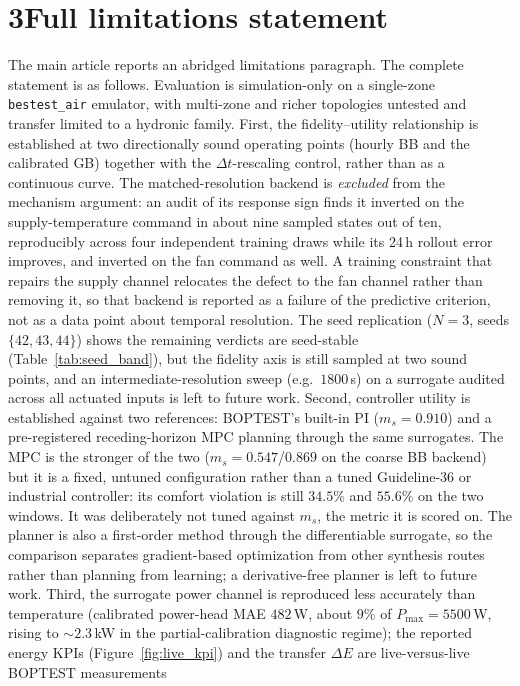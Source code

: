 \documentclass[11pt,a4paper]{article}
\begin{document}
\section*{3\quad Full limitations statement}
The main article reports an abridged limitations paragraph. The complete statement is as follows.
Evaluation is simulation-only on a single-zone \texttt{bestest\_air} emulator, with multi-zone and
richer topologies untested and transfer limited to a hydronic family. First, the fidelity--utility
relationship is established at two directionally sound operating points (hourly BB and the
calibrated GB) together with the $\Delta t$-rescaling control, rather than as a continuous curve.
The matched-resolution backend is \emph{excluded} from the mechanism argument: an audit of its
response sign finds it inverted on the supply-temperature command in about nine sampled states out
of ten, reproducibly across four independent training draws while its 24\,h rollout error improves,
and inverted on the fan command as well. A training constraint that repairs the supply channel
relocates the defect to the fan channel rather than removing it, so that backend is reported as a
failure of the predictive criterion, not as a data point about temporal resolution. The seed
replication ($N=3$, seeds $\{42,43,44\}$) shows the remaining verdicts are seed-stable
(Table~\ref{tab:seed_band}), but the fidelity axis is still sampled at two sound points, and an
intermediate-resolution sweep (e.g.\ $1800$\,s) on a surrogate audited across all actuated inputs
is left to future work. Second, controller utility is established against two references: BOPTEST's
built-in PI ($m_s=0.910$) and a pre-registered receding-horizon MPC planning through the same
surrogates. The MPC is the stronger of the two ($m_s=0.547$/$0.869$ on the coarse BB backend) but
it is a fixed, untuned configuration rather than a tuned Guideline-36 or industrial controller: its
comfort violation is still $34.5\%$ and $55.6\%$ on the two windows. It was deliberately not tuned
against $m_s$, the metric it is scored on. The planner is also a first-order method through the
differentiable surrogate, so the comparison separates gradient-based optimization from other
synthesis routes rather than planning from learning; a derivative-free planner is left to future
work. Third, the surrogate power channel is reproduced less accurately
than temperature (calibrated power-head MAE $482$\,W, about $9\%$ of $P_{\max}=5500$\,W, rising to
${\sim}2.3$\,kW in the partial-calibration diagnostic regime); the reported energy KPIs
(Figure~\ref{fig:live_kpi}) and the transfer $\Delta E$ are live-versus-live BOPTEST measurements
\end{document}
